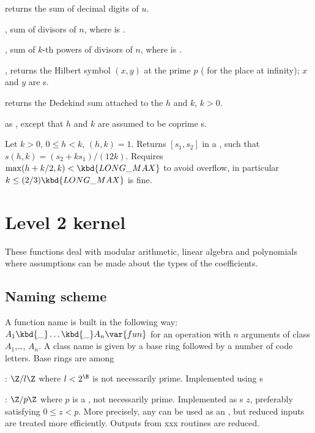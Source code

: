  returns the sum of decimal digits of $u$.

, sum of divisors of  $n$, where
 is .

, sum of $k$-th powers of divisors
of  $n$, where  is .

, returns the Hilbert symbol
$(x,y)$ at the prime $p$ ( for the place at infinity); $x$ and $y$
are s.

 returns the Dedekind sum attached to
the  $h$ and $k$, $k > 0$.

 as , except
that $h$ and $k$ are assumed to be coprime s.

Let $k > 0$, $0 \leq h < k$, $(h,k) = 1$. Returns $[s_1,s_2]$
in a , such that $s(h,k) = (s_2 + k s_1) / (12k)$.
Requires $\max(h + k/2, k) < \kbd{LONG\_MAX}$
to avoid overflow, in particular $k \leq (2/3)\kbd{LONG\_MAX}$ is fine.

\newpage
\chapter{Level 2 kernel}

These functions deal with modular arithmetic, linear algebra and polynomials
where assumptions can be made about the types of the coefficients.

\section{Naming scheme}\label{se:level2names}
A function name is built in the following way:
$A_1\kbd{\_}\dots\kbd{\_}A_n\var{fun}$ for an operation  with $n$
arguments of class $A_1$,\dots, $A_n$. A class name is given by a base ring
followed by a number of code letters. Base rings are among

  : $\Z/l\Z$ where $l < 2^{\B}$ is not necessarily prime. Implemented
            using s

  : $\Z/p\Z$ where $p$ is a , not necessarily prime.
Implemented as s $z$, preferably satisfying $0 \leq z < p$.
More precisely, any  can be used as an , but reduced
inputs are treated more efficiently. Outputs from xxx routines are
reduced.

